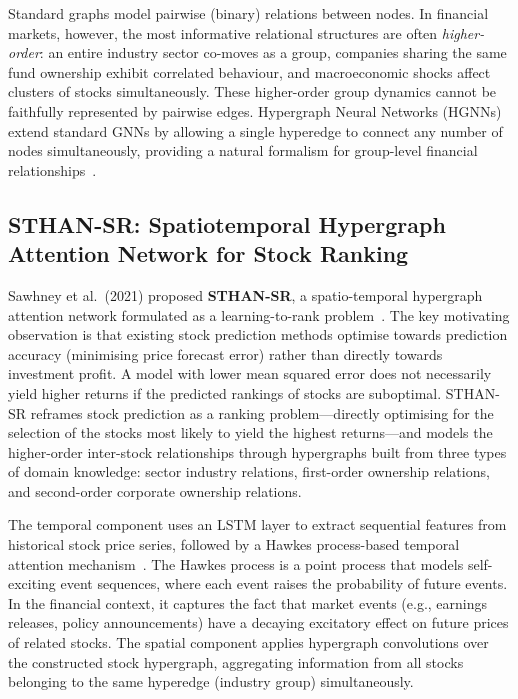 \documentclass[a4paper,11pt]{report}
\begin{document}
Standard graphs model pairwise (binary) relations between nodes. In financial markets, however, the most informative relational structures are often \emph{higher-order}: an entire industry sector co-moves as a group, companies sharing the same fund ownership exhibit correlated behaviour, and macroeconomic shocks affect clusters of stocks simultaneously. These higher-order group dynamics cannot be faithfully represented by pairwise edges. Hypergraph Neural Networks (HGNNs) extend standard GNNs by allowing a single hyperedge to connect any number of nodes simultaneously, providing a natural formalism for group-level financial relationships~\cite{sawhney2021sthan}.

\subsection{STHAN-SR: Spatiotemporal Hypergraph Attention Network for Stock Ranking}

Sawhney et al.\ (2021) proposed \textbf{STHAN-SR}, a spatio-temporal hypergraph attention network formulated as a learning-to-rank problem~\cite{sawhney2021sthan}. The key motivating observation is that existing stock prediction methods optimise towards prediction accuracy (minimising price forecast error) rather than directly towards investment profit. A model with lower mean squared error does not necessarily yield higher returns if the predicted rankings of stocks are suboptimal. STHAN-SR reframes stock prediction as a ranking problem---directly optimising for the selection of the stocks most likely to yield the highest returns---and models the higher-order inter-stock relationships through hypergraphs built from three types of domain knowledge: sector industry relations, first-order ownership relations, and second-order corporate ownership relations.

The temporal component uses an LSTM layer to extract sequential features from historical stock price series, followed by a Hawkes process-based temporal attention mechanism~\cite{sawhney2021sthan}. The Hawkes process is a point process that models self-exciting event sequences, where each event raises the probability of future events. In the financial context, it captures the fact that market events (e.g., earnings releases, policy announcements) have a decaying excitatory effect on future prices of related stocks. The spatial component applies hypergraph convolutions over the constructed stock hypergraph, aggregating information from all stocks belonging to the same hyperedge (industry group) simultaneously.
\end{document}
